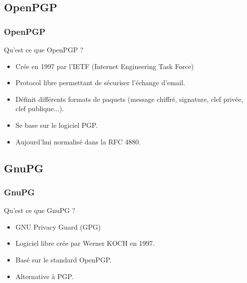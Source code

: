 \subsection{OpenPGP}
\begin{frame}
    \frametitle{\color{white}OpenPGP}
    \begin{block}{Qu'est ce que OpenPGP ?}
    	\begin{itemize}
    	 \item Crée en 1997 par l'IETF (Internet Engineering Task Force)
    	 \item Protocol libre permettant de sécuriser l'échange d'email.
    	 \item Définit différents formats de paquets (message chiffré, signature, clef privée, clef publique...).
    	 \item Se base sur le logiciel PGP.
         \item Aujourd'hui normalisé dans la RFC 4880.
       \end{itemize} 
    \end{block}
\end{frame}

\subsection{GnuPG}
\begin{frame}
    \frametitle{\color{white}GnuPG}
    \begin{block}{Qu'est ce que GnuPG ?}
      \begin{itemize}
        \item GNU Privacy Guard (GPG)
        \item Logiciel libre crée par Werner KOCH en 1997.
        \item Basé sur le standard OpenPGP.
        \item Alternative à PGP.
      \end{itemize}
    \end{block}
\end{frame}
